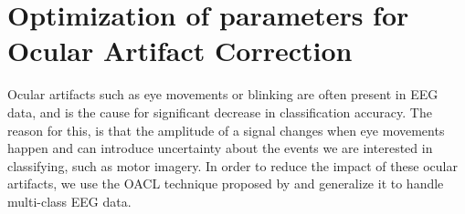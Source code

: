 \section{Optimization of parameters for Ocular Artifact Correction}
Ocular artifacts such as eye movements or blinking are often present in EEG data, and is the cause for significant decrease in classification accuracy. The reason for this, is that the amplitude of a signal changes when eye movements happen and can introduce uncertainty about the events we are interested in classifying, such as motor imagery. In order to reduce the impact of these ocular artifacts, we use the OACL technique proposed by \citet{li2015ocular} and generalize it to handle multi-class EEG data.